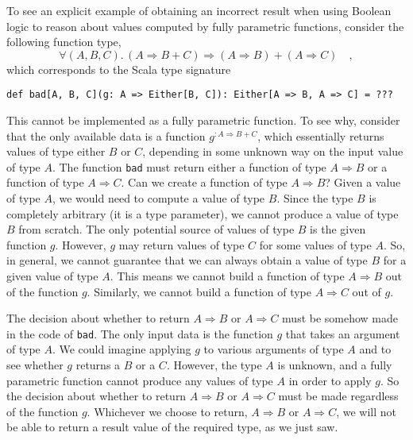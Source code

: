 To see an explicit example of obtaining an incorrect result when using
Boolean logic to reason about values computed by fully parametric
functions, consider the following function type,
\begin{equation}
\forall(A,B,C).\,\left(A\Rightarrow B+C\right)\Rightarrow\left(A\Rightarrow B\right)+\left(A\Rightarrow C\right)\quad,\label{eq:ch-example-boolean-bad-type}
\end{equation}
which corresponds to the Scala type signature
\begin{lstlisting}
def bad[A, B, C](g: A => Either[B, C]): Either[A => B, A => C] = ???
\end{lstlisting}
This cannot be implemented as a fully parametric function. To see
why, consider that the only available data is a function $g^{:A\Rightarrow B+C}$,
which essentially returns values of type either $B$ or $C$, depending
in some unknown way on the input value of type $A$. The function
\lstinline!bad! must return
either a function of type $A\Rightarrow B$ or a function of type
$A\Rightarrow C$. Can we create a function of type $A\Rightarrow B$?
Given a value of type $A$, we would need to compute a value of type
$B$. Since the type $B$ is completely arbitrary (it is a type parameter),
we cannot produce a value of type $B$ from scratch. The only potential
source of values of type $B$ is the given function $g$. However,
$g$ may return values of type $C$ for some values of type $A$.
So, in general, we cannot guarantee that we can always obtain a value
of type $B$ for a given value of type $A$. This means we cannot
build a function of type $A\Rightarrow B$ out of the function $g$.
Similarly, we cannot build a function of type $A\Rightarrow C$ out
of $g$. 

The decision about whether to return $A\Rightarrow B$ or $A\Rightarrow C$
must be somehow made in the code of \lstinline!bad!.
The only input data is the function $g$ that takes an argument of
type $A$. We could imagine applying $g$ to various arguments of
type $A$ and to see whether $g$ returns a $B$ or a $C$. However,
the type $A$ is unknown, and a fully parametric function cannot produce
any values of type $A$ in order to apply $g$. So the decision about
whether to return $A\Rightarrow B$ or $A\Rightarrow C$ must be made
regardless of the function $g$. Whichever we choose to return, $A\Rightarrow B$
or $A\Rightarrow C$, we will not be able to return a result value
of the required type, as we just saw.

